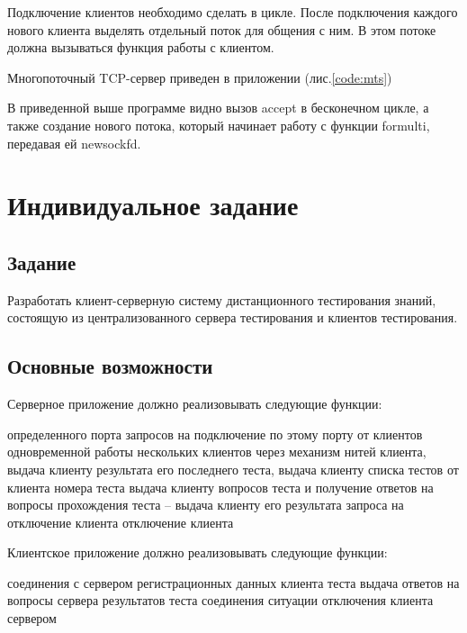 Подключение клиентов необходимо сделать в цикле. После подключения каждого нового клиента выделять отдельный поток для общения с ним. В этом потоке должна вызываться функция работы с клиентом. 

Многопоточный TCP-сервер приведен в приложении (лис.\ref{code:mts})

В приведенной выше программе видно вызов accept в бесконечном цикле, а также создание нового потока, который начинает работу с функции formulti, передавая ей newsockfd. 

\section{Индивидуальное задание}

\subsection{Задание} 

Разработать клиент-серверную систему дистанционного тестирования знаний, состоящую из централизованного сервера тестирования и клиентов тестирования.

\subsection{Основные возможности}

Серверное приложение должно реализовывать следующие функции:
\vspace{5mm}

\begin{enumerate}
 определенного порта
 запросов на подключение по этому порту от клиентов
 одновременной работы нескольких клиентов через механизм нитей
 клиента, выдача клиенту результата его последнего теста, выдача клиенту списка тестов
 от клиента номера теста
 выдача клиенту вопросов теста и получение ответов на вопросы
 прохождения теста – выдача клиенту его результата
 запроса на отключение клиента
 отключение клиента
\end{enumerate}

\vspace{5mm}
Клиентское приложение должно реализовывать следующие функции:
\vspace{5mm}

\begin{enumerate}
 соединения с сервером
 регистрационных данных клиента
 теста
 выдача ответов на вопросы сервера
 результатов теста
 соединения
 ситуации отключения клиента сервером
\end{enumerate}

